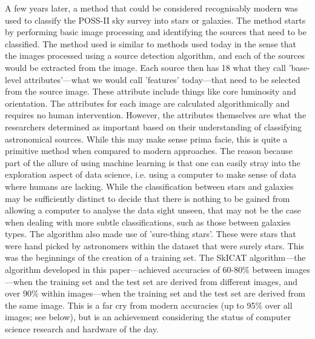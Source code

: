 \documentclass[a4paper,11pt]{article}
\begin{document}
A few years later, a method that could be considered recognisably modern was used to classify the POSS-II sky survey into stars or galaxies.\cite{fayyad_1993_applying} The method starts by performing basic image processing and identifying the sources that need to be classified. The method used is similar to methods used today in the sense that the images processed using a source detection algorithm, and each of the sources would be extracted from the image. Each source then has 18 what they call 'base-level attributes'—what we would call 'features' today—that need to be selected from the source image. These attribute include things like core luminosity and orientation. The attributes for each image are calculated algorithmically and requires no human intervention. However, the attributes themselves are what the researchers determined as important based on their understanding of classifying astronomical sources. While this may make sense prima facie, this is quite a primitive method when compared to modern approaches. The reason because part of the allure of using machine learning is that one can easily stray into the exploration aspect of data science, i.e. using a computer to make sense of data where humans are lacking. While the classification between stars and galaxies may be sufficiently distinct to decide that there is nothing to be gained from allowing a computer to analyse the data sight unseen, that may not be the case when dealing with more subtle classifications, such as those between galaxies types. The algorithm also made use of 'sure-thing stars'. These were stars that were hand picked by astronomers within the dataset that were surely stars. This was the beginnings of the creation of a training set. The SkICAT algorithm—the algorithm developed in this paper—achieved accuracies of 60-80\% between images—when the training set and the test set are derived from different images, and over 90\% within images—when the training set and the test set are derived from the same image. This is a far cry from modern accuracies (up to 95\% over all images; see below), but is an achievement considering the status of computer science research and hardware of the day.
\end{document}
